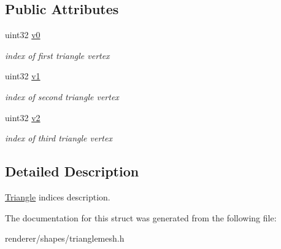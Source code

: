 \subsection*{Public Attributes}
\begin{DoxyCompactItemize}
\item 
\hypertarget{structembree_1_1_triangle_mesh_1_1_triangle_a6a64226573e6c69a7222711ffc70633b}{
uint32 \hyperlink{structembree_1_1_triangle_mesh_1_1_triangle_a6a64226573e6c69a7222711ffc70633b}{v0}}
\label{structembree_1_1_triangle_mesh_1_1_triangle_a6a64226573e6c69a7222711ffc70633b}

\begin{DoxyCompactList}\small\item\em index of first triangle vertex \item\end{DoxyCompactList}\item 
\hypertarget{structembree_1_1_triangle_mesh_1_1_triangle_ac59363b7ae88edca1535d6b9399303ac}{
uint32 \hyperlink{structembree_1_1_triangle_mesh_1_1_triangle_ac59363b7ae88edca1535d6b9399303ac}{v1}}
\label{structembree_1_1_triangle_mesh_1_1_triangle_ac59363b7ae88edca1535d6b9399303ac}

\begin{DoxyCompactList}\small\item\em index of second triangle vertex \item\end{DoxyCompactList}\item 
\hypertarget{structembree_1_1_triangle_mesh_1_1_triangle_a4551769e0d69379ed105b52f465cb003}{
uint32 \hyperlink{structembree_1_1_triangle_mesh_1_1_triangle_a4551769e0d69379ed105b52f465cb003}{v2}}
\label{structembree_1_1_triangle_mesh_1_1_triangle_a4551769e0d69379ed105b52f465cb003}

\begin{DoxyCompactList}\small\item\em index of third triangle vertex \item\end{DoxyCompactList}\end{DoxyCompactItemize}


\subsection{Detailed Description}
\hyperlink{structembree_1_1_triangle_mesh_1_1_triangle}{Triangle} indices description. 

The documentation for this struct was generated from the following file:\begin{DoxyCompactItemize}
\item 
renderer/shapes/trianglemesh.h\end{DoxyCompactItemize}
